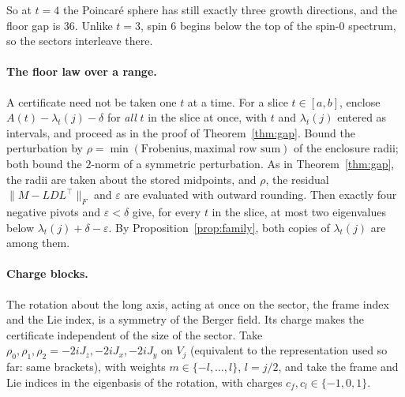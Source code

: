 \documentclass[11pt]{article}
\theoremstyle{definition}
\theoremstyle{remark}
\newcommand{\norm}[1]{\lVert #1\rVert}
\begin{document}
So at $t=4$ the Poincar\'e sphere has still exactly three growth directions, and the floor gap is $36$. Unlike $t=3$, spin $6$
begins below the top of the spin-$0$ spectrum, so the sectors interleave there.

\paragraph{The floor law over a range.} A certificate need not be taken one $t$ at a time. For a slice
$t\in[a,b]$, enclose $A(t)-\lambda_t(j)-\delta$ for \emph{all} $t$ in the slice at once, with $t$ and
$\lambda_t(j)$ entered as intervals, and proceed as in the proof of Theorem~\ref{thm:gap}. Bound the
perturbation by $\rho=\min(\text{Frobenius},\text{maximal row sum})$ of the enclosure radii; both bound the
$2$-norm of a symmetric perturbation. As in Theorem~\ref{thm:gap}, the radii are taken about the stored
midpoints, and $\rho$, the residual $\norm{M-LDL^\top}_F$ and $\varepsilon$ are evaluated with outward rounding. Then exactly four negative pivots and $\varepsilon<\delta$ give, for every
$t$ in the slice, at most two eigenvalues below $\lambda_t(j)+\delta-\varepsilon$. By
Proposition~\ref{prop:family}, both copies of $\lambda_t(j)$ are among them.

\paragraph{Charge blocks.} The rotation about the long axis, acting at once on the sector, the frame index
and the Lie index, is a symmetry of the Berger field. Its charge makes the certificate independent of the size of
the sector. Take $\rho_0,\rho_1,\rho_2=-2iJ_z,-2iJ_x,-2iJ_y$ on $V_j$ (equivalent to the representation used so
far: same brackets), with weights $m\in\{-l,\dots,l\}$, $l=j/2$, and take the frame and Lie indices in the
eigenbasis of the rotation, with charges $c_f,c_l\in\{-1,0,1\}$.
\end{document}
